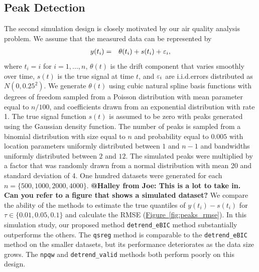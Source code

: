 \documentclass[aoas]{imsart}
\makeatletter
\newcommand{\Halley}[2]{{\bf {\color{purple}@Halley from #1: #2}}\xspace}
\newcommand{\Fig}[1]{\hyperref[fig:#1]{Figure~\ref*{fig:#1}}} %
\newcommand{\Fig}[1]{{Figure~\ref{fig:#1}}} %
\newcommand{\VE}[2]{\MakeLowercase{#1}_{#2}} %
\makeatother
\begin{document}
\subsection{Peak Detection}
The second simulation design is closely motivated by our air quality analysis problem. We assume that the measured data can be represented by
\begin{eqnarray*}
	y(t_i) & = & \theta(t_i) + s(t_i) + \VE{\varepsilon}{i},
\end{eqnarray*}
where $t_i = i$ for $i = 1, ..., n$, $\theta(t)$ is the drift component that varies smoothly over time, $s(t)$ is the true signal at time $t$, and $\VE{\varepsilon}{i}$ are i.i.d.\@ errors distributed as $N(0, 0.25^2)$. We generate $\theta(t)$ using cubic natural spline basis functions with degrees of freedom sampled from a Poisson distribution with mean parameter equal to $n/100$,  and coefficients drawn from an exponential distribution with rate 1. The true signal function $s(t)$ is assumed to be zero with peaks generated using the Gaussian density function. The number of peaks is sampled from a binomial distribution with size equal to $n$ and probability equal to $0.005$ with location parameters uniformly distributed between $1$ and $n-1$ and bandwidths uniformly distributed between $2$ and $12$. The simulated peaks were multiplied by a factor that was randomly drawn from a normal distribution with mean 20 and standard deviation of 4. One hundred datasets were generated for each $n=\{500, 1000, 2000, 4000\}$. \Halley{Joe}{This is a lot to take in. Can you refer to a figure that shows a simulated dataset?} We compare the ability of the methods to estimate the true quantiles of $y(t_i)-s(t_i)$  for $\tau \in \{0.01, 0.05, 0.1\}$ and calculate the RMSE (\Fig{peaks_rmse}). In this simulation study, our proposed method \texttt{detrend\_eBIC} method substantially outperforms the others. The \texttt{qsreg} method is comparable to the \texttt{detrend\_eBIC} method on the smaller datasets, but its performance deteriorates as the data size grows. The \texttt{npqw} and \texttt{detrend\_valid} methods both perform poorly on this design.
\end{document}
